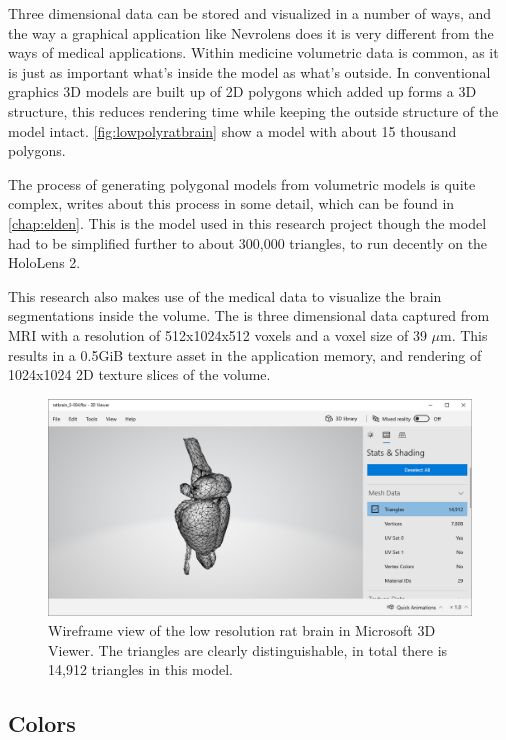 Three dimensional data can be stored and visualized in a number of ways, and the way a graphical application like Nevrolens does it is very different from the ways of medical applications. Within medicine volumetric data is common, as it is just as important what's inside the model as what's outside. In conventional graphics 3D models are built up of 2D polygons which added up forms a 3D structure, this reduces rendering time while keeping the outside structure of the model intact. \autoref{fig:lowpolyratbrain} show a model with about 15 thousand polygons. 

The process of generating polygonal models from volumetric models is quite complex, \citet{Elden2017} writes about this process in some detail, which can be found in \autoref{chap:elden}. This is the model used in this research project though the model had to be simplified further to about 300,000 triangles, to run decently on the HoloLens 2.  

This research also makes use of the medical data to visualize the brain segmentations inside the volume. The is three dimensional data captured from MRI with a resolution of 512x1024x512 voxels and a voxel size of 39 $\mu$m. This results in a 0.5GiB texture asset in the application memory, and rendering of 1024x1024 2D texture slices of the volume.

\begin{figure}[ht]
    \centering
    \includegraphics[width=\textwidth]{fig/ratbrain_lowpoly}
    \caption{Wireframe view of the low resolution rat brain in Microsoft 3D Viewer. The triangles are clearly distinguishable, in total there is 14,912 triangles in this model. }
    \label{fig:lowpolyratbrain}
\end{figure}



\subsection*{Colors}

